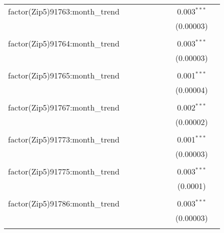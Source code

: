 \begin{table}[H]
{\begin{tabular}{@{\extracolsep{5pt}}lcccccccc}
  factor(Zip5)91763:month\_trend &  &  &  &  &  &  & 0.003$^{***}$ &  \\  

   &  &  &  &  &  &  & (0.00003) &  \\  

   & & & & & & & & \\  

  factor(Zip5)91764:month\_trend &  &  &  &  &  &  & 0.003$^{***}$ &  \\  

   &  &  &  &  &  &  & (0.00003) &  \\  

   & & & & & & & & \\  

  factor(Zip5)91765:month\_trend &  &  &  &  &  &  & 0.001$^{***}$ &  \\  

   &  &  &  &  &  &  & (0.00004) &  \\  

   & & & & & & & & \\  

  factor(Zip5)91767:month\_trend &  &  &  &  &  &  & 0.002$^{***}$ &  \\  

   &  &  &  &  &  &  & (0.00002) &  \\  

   & & & & & & & & \\  

  factor(Zip5)91773:month\_trend &  &  &  &  &  &  & 0.001$^{***}$ &  \\  

   &  &  &  &  &  &  & (0.00003) &  \\  

   & & & & & & & & \\  

  factor(Zip5)91775:month\_trend &  &  &  &  &  &  & 0.003$^{***}$ &  \\  

   &  &  &  &  &  &  & (0.0001) &  \\  

   & & & & & & & & \\  

  factor(Zip5)91786:month\_trend &  &  &  &  &  &  & 0.003$^{***}$ &  \\  

   &  &  &  &  &  &  & (0.00003) &  \\  

   & & & & & & & & \\  


\end{tabular}}
\end{table}
